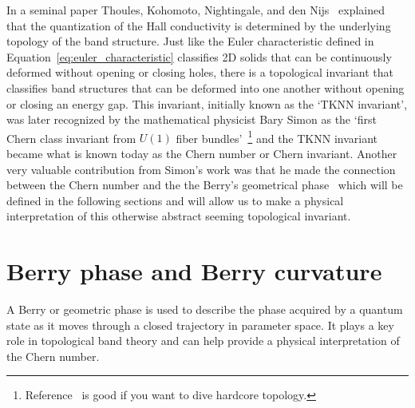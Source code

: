 In a seminal paper Thoules, Kohomoto, Nightingale, and den Nijs~\cite{thouless_quantized_1982} explained that the quantization of the Hall conductivity is determined by the underlying topology of the band structure. Just like the Euler characteristic defined in Equation~\ref{eq:euler_characteristic} classifies 2D solids that can be continuously deformed without opening or closing holes, there is a topological invariant that classifies band structures that can be deformed into one another without opening or closing an energy gap. This invariant, initially known as the `TKNN invariant', was later recognized by the mathematical physicist Bary Simon as the `first Chern class invariant from $U(1)$ fiber bundles'~\cite{simon_holonomy_1983}\footnote{Reference~\cite{geometry_topology_physics} is good if you want to dive hardcore topology.} and the TKNN invariant became what is known today as the Chern number or Chern invariant. Another very valuable contribution from Simon's work was that he made the connection between the Chern number and the the Berry's geometrical phase~\cite{berry_michael_victor_quantal_1984} which will be defined in the following sections and will allow us to make a physical interpretation of this otherwise abstract seeming topological invariant. 

\section{Berry phase and Berry curvature}
\label{sec:Berry phase and curvature}

A Berry or geometric phase is used to describe the phase acquired by a quantum state as it moves through a closed trajectory in parameter space. It plays a key role in topological band theory and can help provide a physical interpretation of the Chern number. 

